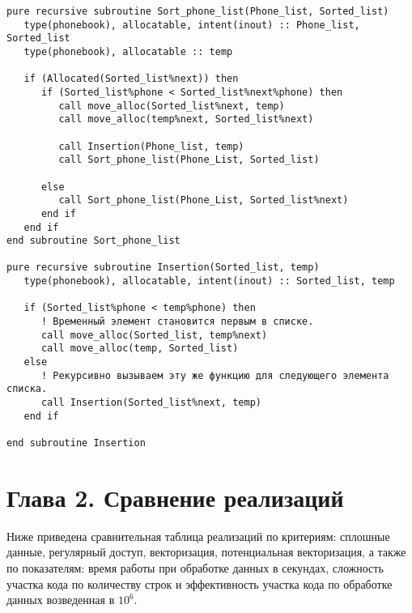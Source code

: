 \documentclass[a4paper,14pt]{article}
\begin{document}
\begin{lstlisting}[caption={Сортировка телефонных номеров методом вставок с помощью move\_alloc}]
pure recursive subroutine Sort_phone_list(Phone_list, Sorted_list)
   type(phonebook), allocatable, intent(inout) :: Phone_list, Sorted_list
   type(phonebook), allocatable :: temp

   if (Allocated(Sorted_list%next)) then
      if (Sorted_list%phone < Sorted_list%next%phone) then
         call move_alloc(Sorted_list%next, temp)
         call move_alloc(temp%next, Sorted_list%next)

         call Insertion(Phone_list, temp)
         call Sort_phone_list(Phone_List, Sorted_list)

      else
         call Sort_phone_list(Phone_List, Sorted_list%next)
      end if
   end if
end subroutine Sort_phone_list

pure recursive subroutine Insertion(Sorted_list, temp)
   type(phonebook), allocatable, intent(inout) :: Sorted_list, temp

   if (Sorted_list%phone < temp%phone) then
      ! Временный элемент становится первым в списке.
      call move_alloc(Sorted_list, temp%next)
      call move_alloc(temp, Sorted_list)
   else 
      ! Рекурсивно вызываем эту же функцию для следующего элемента списка.
      call Insertion(Sorted_list%next, temp)
   end if

end subroutine Insertion
\end{lstlisting}
\newpage

\section{Глава 2. Сравнение реализаций}

Ниже приведена сравнительная таблица реализаций по критериям: сплошные данные, регулярный доступ, векторизация, потенциальная векторизация, а также по показателям: время работы при обработке данных в секундах, сложность участка кода по количеству строк и эффективность участка кода по обработке данных возведенная в $10^6$.
\end{document}
